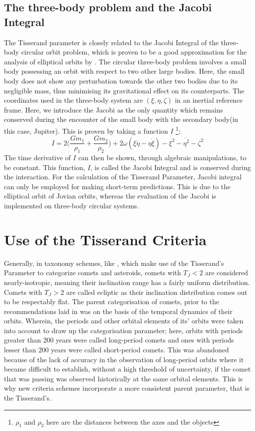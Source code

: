 \documentclass{article}
\begin{document}
\subsection{The three-body problem and the Jacobi Integral}
The Tisserand parameter is closely related to the Jacobi Integral of the three-body circular orbit problem, which is proven to be a good approximation for the analysis of elliptical orbits by \cite{10.1093/mnras/123.1.1}. The circular three-body problem involves a small body possessing an orbit with respect to two other large bodies. Here, the small body does not show any perturbation towards the other two bodies due to its negligible mass, thus minimising its gravitational effect on its counterparts. The coordinates used in the three-body system are $(\xi, \eta, \zeta)$ in an inertial reference frame. 
Here, we introduce the Jacobi as the only quantity which remains conserved during the encounter of the small body with the secondary body(in this case, Jupiter). This is proven by taking a function $I$ \footnote{$\rho_1$ and $\rho_2$ here are the distances between the axes and the objects}: 
\begin{equation}
    I = 2 \bigg( \frac{Gm_1}{\rho_1}+ \frac{Gm_2}{\rho_2}\bigg) + 2\omega(\xi \dot{\eta}-\eta \dot{\xi})-\dot{\xi^2}-\dot{\eta^2}-\zeta^2
\end{equation}
The time derivative of $I$ can then be shown, through algebraic manipulations, to be constant. This function, $I$, is called the Jacobi Integral and is conserved during the interaction. For the calculation of the Tisserand Parameter, Jacobi integral can only be employed for making short-term predictions. This is due to the elliptical orbit of Jovian orbits, whereas the evaluation of the Jacobi is implemented on three-body circular systems.



\section{Use of the Tisserand Criteria}
Generally, in taxonomy schemes, like \cite{1996ASPC..107..173L}, which make use of the Tisserand's Parameter to categorize comets and asteroids, comets with $T_J < 2$ are considered nearly-isotropic, meaning their inclination range has a fairly uniform distribution. Comets with $T_J > 2$ are called ecliptic as their inclination distribution comes out to be respectably flat. The parent categorisation of comets, prior to the recommendations laid in \cite{1996ASPC..107..173L} was on the basis of the temporal dynamics of their orbits. Wherein, the periods and other orbital elements of its' orbits were taken into account to draw up the categorisation parameter; here, orbits with periods greater than $200$ years were called long-period comets and ones with periods lesser than $200$ years were called short-period comets. This was abandoned because of the lack of accuracy in the observation of long-period orbits where it became difficult to establish, without a high threshold of uncertainty, if the comet that was passing was observed historically at the same orbital elements. This is why new criteria schemes incorporate a more consistent parent parameter, that is the Tisserand's. 
\end{document}
